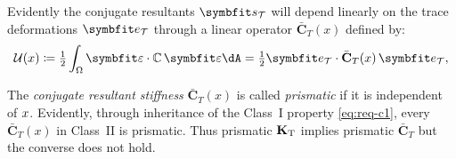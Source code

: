 Evidently the conjugate resultants \(\TraceStress\) will depend linearly on the trace deformations \(\TraceStrain\) through a linear operator \(\bar{\mathbf{C}}_T(x)\) defined by:
\begin{equation}
\mathcal{U}(x) \coloneq \tfrac{1}{2}\int_\Section \bm{\varepsilon} \cdot \mathbb{C}\, \bm{\varepsilon} \dA 
= \tfrac{1}{2}\TraceStrain \cdot \bar{\mathbf{C}}_T(x) \,\TraceStrain,
\label{eq:energy-conjugacy-def}
\end{equation}

\begin{remark}
The \emph{conjugate resultant stiffness} \(\bar{\mathbf{C}}_T(x)\) is called \emph{prismatic} if it is independent of \(x\). 
Evidently, through inheritance of the Class~I property \eqref{eq:req-c1}, every \(\bar{\mathbf{C}}_T(x)\) in Class~II is prismatic. 
%
Thus prismatic $\mathbf{K}_{\rm T}$ implies prismatic $\bar{\mathbf{C}}_T$ but the converse does not hold. 
\end{remark}

